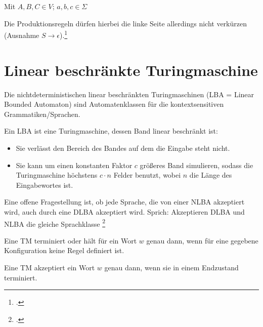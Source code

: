 \documentclass{lehramt-informatik-haupt}
\begin{document}
Mit $A,B,C \in V$; $a,b,c \in \Sigma$



Die Produktionsregeln dürfen hierbei die linke Seite allerdings nicht
verkürzen (Ausnahme $S \rightarrow \epsilon$).\footcite{theo:fs:3}

%

\section{Linear beschränkte Turingmaschine}

\begin{liQuellen}
\item \cite[Seite 312-317]{hoffmann}
\end{liQuellen}

Die nichtdeterministischen linear beschränkten Turingmaschinen
(LBA = Linear Bounded Automaton) sind Automatenklassen für die
kontextsensitiven Grammatiken/Sprachen.

Ein LBA ist eine Turingmaschine, dessen Band linear beschränkt ist:

\begin{itemize}
\item[Definition 1]

Sie verlässt den Bereich des Bandes auf dem die Eingabe steht nicht.

\item[Definition 2]

Sie kann um einen konstanten Faktor $c$ größeres Band simulieren, sodass
die Turingmaschine höchstens $c \cdot n$ Felder benutzt, wobei $n$ die
Länge des Eingabewortes ist.
\end{itemize}

Eine offene Fragestellung ist, ob jede Sprache, die von einer NLBA
akzeptiert wird, auch durch eine DLBA akzeptiert wird. Sprich:
Akzeptieren DLBA und NLBA die gleiche Sprachklasse
\footcite[Seite 10]{theo:fs:3}

Eine TM terminiert oder hält für ein Wort $w$ genau dann, wenn für
eine gegebene Konfiguration keine Regel definiert ist.

Eine TM akzeptiert ein Wort $w$ genau dann, wenn sie in einem
Endzustand terminiert.
\end{document}
